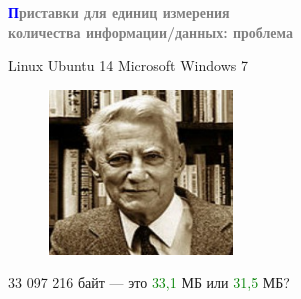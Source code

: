 \begin{frame}{\hspace{5.5cm}\textbf{\textcolor{blue}{П}\textcolor{gray}{риставки для единиц измерения\\\hspace{4cm}количества информации/данных: проблема}}}

    \fontsize{11pt}{13pt}\selectfont
    \hspace{2cm}Linux Ubuntu 14 \hspace{2.7cm}Microsoft Windows 7

    \begin{figure}
        \centering
        \includegraphics[scale =0.4]{Slide18.png}
    \end{figure}
    
    \medskip
    \fontsize{11pt}{13pt}\selectfont
    \hspace{2.5cm}33 097 216 байт — это \textcolor{Green}{33,1} МБ или \textcolor{Green}{31,5} МБ?
    
\end{frame}